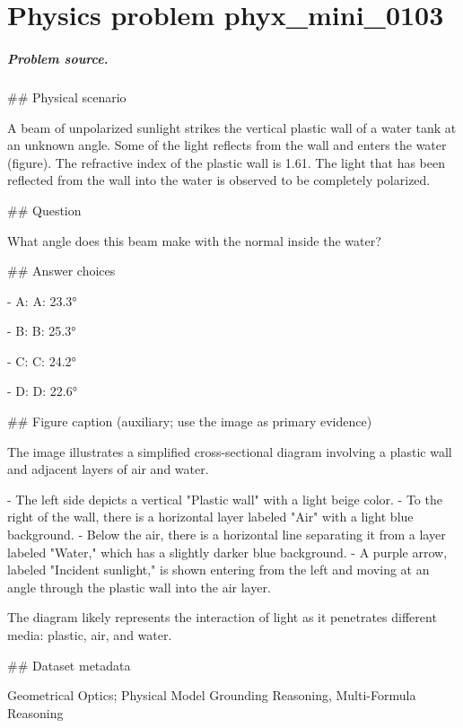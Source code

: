 
\chapter{Physics problem phyx\_mini\_0103}
\label{ch:PhyXMiniProblems_problem_phyx_mini_0103}

\paragraph{Problem source.}
\#\# Physical scenario

A beam of unpolarized sunlight strikes the vertical plastic wall of a water tank at an unknown angle. Some of the light reflects from the wall and enters the water (figure). The refractive index of the plastic wall is 1.61. The light that has been reflected from the wall into the water is observed to be completely polarized.

\#\# Question

What angle does this beam make with the normal inside the water?

\#\# Answer choices

- A: A: 23.3°

- B: B: 25.3°

- C: C: 24.2°

- D: D: 22.6°

\#\# Figure caption (auxiliary; use the image as primary evidence)

The image illustrates a simplified cross-sectional diagram involving a plastic wall and adjacent layers of air and water. 

- The left side depicts a vertical "Plastic wall" with a light beige color.
- To the right of the wall, there is a horizontal layer labeled "Air" with a light blue background.
- Below the air, there is a horizontal line separating it from a layer labeled "Water," which has a slightly darker blue background.
- A purple arrow, labeled "Incident sunlight," is shown entering from the left and moving at an angle through the plastic wall into the air layer. 

The diagram likely represents the interaction of light as it penetrates different media: plastic, air, and water.

\#\# Dataset metadata

Geometrical Optics; Physical Model Grounding Reasoning, Multi-Formula Reasoning

